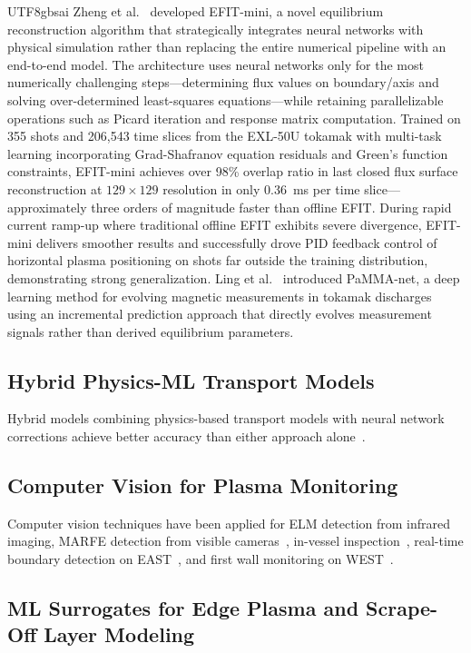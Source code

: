 \documentclass[12pt,a4paper]{article}
\begin{document}
\begin{CJK}{UTF8}{gbsai}
Zheng et al.~\citep{Zheng2025} developed EFIT-mini, a novel equilibrium reconstruction algorithm that strategically integrates neural networks with physical simulation rather than replacing the entire numerical pipeline with an end-to-end model. The architecture uses neural networks only for the most numerically challenging steps---determining flux values on boundary/axis and solving over-determined least-squares equations---while retaining parallelizable operations such as Picard iteration and response matrix computation. Trained on 355 shots and 206,543 time slices from the EXL-50U tokamak with multi-task learning incorporating Grad-Shafranov equation residuals and Green's function constraints, EFIT-mini achieves over 98\% overlap ratio in last closed flux surface reconstruction at $129\times129$ resolution in only 0.36~ms per time slice---approximately three orders of magnitude faster than offline EFIT. During rapid current ramp-up where traditional offline EFIT exhibits severe divergence, EFIT-mini delivers smoother results and successfully drove PID feedback control of horizontal plasma positioning on shots far outside the training distribution, demonstrating strong generalization. Ling et al.~\citep{Ling2025} introduced PaMMA-net, a deep learning method for evolving magnetic measurements in tokamak discharges using an incremental prediction approach that directly evolves measurement signals rather than derived equilibrium parameters.

\subsection{Hybrid Physics-ML Transport Models}

Hybrid models combining physics-based transport models with neural network corrections achieve better accuracy than either approach alone~\citep{Meneghini2024OMFIT}.

\subsection{Computer Vision for Plasma Monitoring}

Computer vision techniques have been applied for ELM detection from infrared imaging, MARFE detection from visible cameras~\citep{Vega2024}, in-vessel inspection~\citep{Vayakis2024}, real-time boundary detection on EAST~\citep{Zhang2026Boundary}, and first wall monitoring on WEST~\citep{Grelier2025}.

\subsection{ML Surrogates for Edge Plasma and Scrape-Off Layer Modeling}


\end{CJK}
\end{document}

